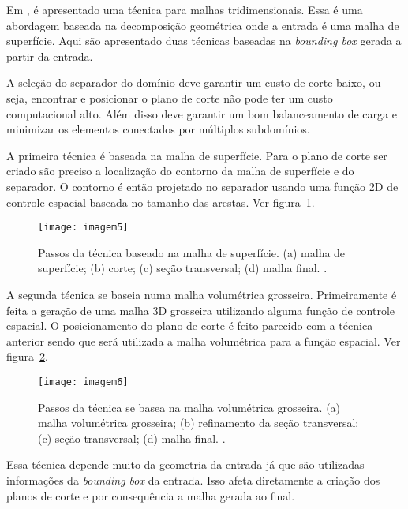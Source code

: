 Em \cite{bib:Glut08}, é apresentado uma técnica para malhas tridimensionais. Essa é uma abordagem baseada na decomposição geométrica onde a entrada é uma malha de superfície. Aqui são apresentado duas técnicas baseadas na \textit{bounding box} gerada a partir da entrada.

A seleção do separador do domínio deve garantir um custo de corte baixo, ou seja, encontrar e posicionar o plano de corte não pode ter um custo computacional alto. Além disso deve garantir um bom balanceamento de carga e minimizar os elementos conectados por múltiplos subdomínios.

A primeira técnica é baseada na malha de superfície. Para o plano de corte ser criado são preciso a localização do contorno da malha de superfície e do separador. O contorno é então projetado no separador usando uma função 2D de controle espacial baseada no tamanho das arestas. Ver figura~\ref{fig:imagem5}.

 \begin{figure}[htbp]
     \centering
     \texttt{[image: imagem5]}
     \caption{Passos da técnica baseado na malha de superfície. (a) malha de superfície; (b) corte; (c) seção transversal; (d) malha final. \cite{bib:Glut08}.}
     \label{fig:imagem5}
 \end{figure}

A segunda técnica se baseia numa malha volumétrica grosseira. Primeiramente é feita a geração de uma malha 3D grosseira utilizando alguma função de controle espacial. O posicionamento do plano de corte é feito parecido com a técnica anterior sendo que será utilizada a malha volumétrica para a função espacial. Ver figura~\ref{fig:imagem6}.

 \begin{figure}[htbp]
     \centering
     \texttt{[image: imagem6]}
     \caption{Passos da técnica se basea na malha volumétrica grosseira. (a) malha volumétrica grosseira; (b) refinamento da seção transversal; (c) seção transversal; (d) malha final. \cite{bib:Glut08}.}
     \label{fig:imagem6}
 \end{figure}

Essa técnica depende muito da geometria da entrada já que são utilizadas informações da \textit{bounding box} da entrada. Isso afeta diretamente a criação dos planos de corte e por consequência a malha gerada ao final.

